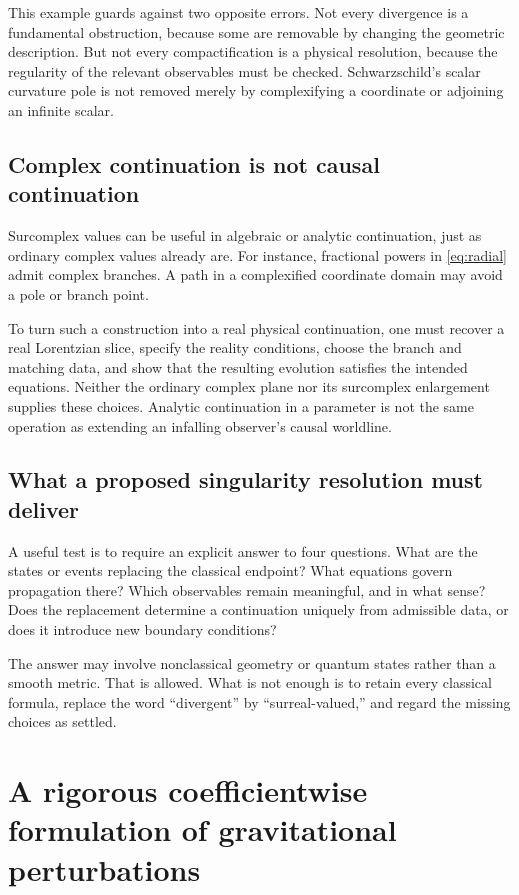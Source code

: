 \documentclass[11pt,letterpaper]{article}
\theoremstyle{definition}
\theoremstyle{remark}
\begin{document}
This example guards against two opposite errors. Not every divergence is a
fundamental obstruction, because some are removable by changing the geometric
description. But not every compactification is a physical resolution, because
the regularity of the relevant observables must be checked. Schwarzschild's
scalar curvature pole is not removed merely by complexifying a coordinate or
adjoining an infinite scalar.

\subsection{Complex continuation is not causal continuation}

Surcomplex values can be useful in algebraic or analytic continuation, just
as ordinary complex values already are. For instance, fractional powers in
\eqref{eq:radial} admit complex branches. A path in a complexified coordinate
domain may avoid a pole or branch point.

To turn such a construction into a real physical continuation, one must
recover a real Lorentzian slice, specify the reality conditions, choose the
branch and matching data, and show that the resulting evolution satisfies the
intended equations. Neither the ordinary complex plane nor its surcomplex
enlargement supplies these choices. Analytic continuation in a parameter is
not the same operation as extending an infalling observer's causal worldline.

\subsection{What a proposed singularity resolution must deliver}

A useful test is to require an explicit answer to four questions. What are the
states or events replacing the classical endpoint? What equations govern
propagation there? Which observables remain meaningful, and in what sense?
Does the replacement determine a continuation uniquely from admissible data,
or does it introduce new boundary conditions?

The answer may involve nonclassical geometry or quantum states rather than a
smooth metric. That is allowed. What is not enough is to retain every classical
formula, replace the word ``divergent'' by ``surreal-valued,'' and regard the
missing choices as settled.

\section{A rigorous coefficientwise formulation of gravitational perturbations}
\label{sec:formalGR}
\end{document}
